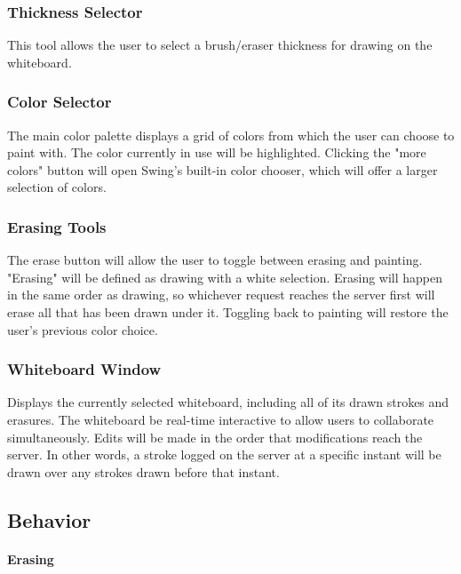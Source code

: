 \subsubsection{Thickness Selector}

This tool allows the user to select a brush/eraser thickness for drawing on the whiteboard.

\subsubsection{Color Selector}

The main color palette displays a grid of colors from which the user can choose to paint with. The color currently in use will be highlighted. Clicking the "more colors" button will open Swing's built-in color chooser, which will offer a larger selection of colors.

\subsubsection{Erasing Tools}

The erase button will allow the user to toggle between erasing and painting. "Erasing" will be defined as drawing with a white selection. Erasing will happen in the same order as drawing, so whichever request reaches the server first will erase all that has been drawn under it. Toggling back to painting will restore the user's previous color choice.

\subsubsection{Whiteboard Window}

Displays the currently selected whiteboard, including all of its drawn strokes and erasures. The whiteboard be real-time interactive to allow users to collaborate simultaneously. Edits will be made in the order that modifications reach the server. In other words, a stroke logged on the server at a specific instant will be drawn over any strokes drawn before that instant.

\subsection{Behavior}

\paragraph{Erasing}

